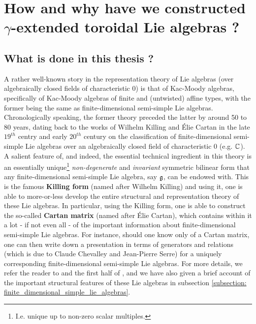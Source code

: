 \section{How and why have we constructed \texorpdfstring{$\gamma$}{}-extended toroidal Lie algebras ?}
    \subsection{What is done in this thesis ?}
        A rather well-known story in the representation theory of Lie algebras (over algebraically closed fields of characteristic $0$) is that of Kac-Moody algebras, specifically of Kac-Moody algebras of finite and (untwisted) affine types, with the former being the same as finite-dimensional semi-simple Lie algebras. Chronologically speaking, the former theory preceded the latter by around 50 to 80 years, dating back to the works of Wilhelm Killing and \'Elie Cartan in the late $19^{th}$ centry and early $20^{th}$ century on the classification of finite-dimensional semi-simple Lie algebras over an algebraically closed field of characteristic $0$ (e.g. $\mathbb{C}$). A salient feature of, and indeed, the essential technical ingredient in this theory is an essentially unique\footnote{I.e. unique up to non-zero scalar multiples.} \textit{non-degenerate} and \textit{invariant} symmetric bilinear form that any finite-dimensional semi-simple Lie algebra, say $\mathfrak{g}$, can be endowed with. This is the famous \textbf{Killing form} (named after Wilhelm Killing) and using it, one is able to more-or-less develop the entire structural and representation theory of these Lie algebras. In particular, using the Killing form, one is able to construct the so-called \textbf{Cartan matrix} (named after \'Elie Cartan), which contains within it a lot - if not even all - of the important information about finite-dimensional semi-simple Lie algebras. For instance, should one know only of a Cartan matrix, one can then write down a presentation in terms of generators and relations (which is due to Claude Chevalley and Jean-Pierre Serre) for a uniquely corresponding finite-dimensional semi-simple Lie algebras. For more details, we refer the reader to \cite{humphreys_lie_algebras} and the first half of \cite{carter_affine_lie_algebras}, and we have also given a brief account of the important structural features of these Lie algebras in subsection \ref{subsection: finite_dimensional_simple_lie_algebras}.

